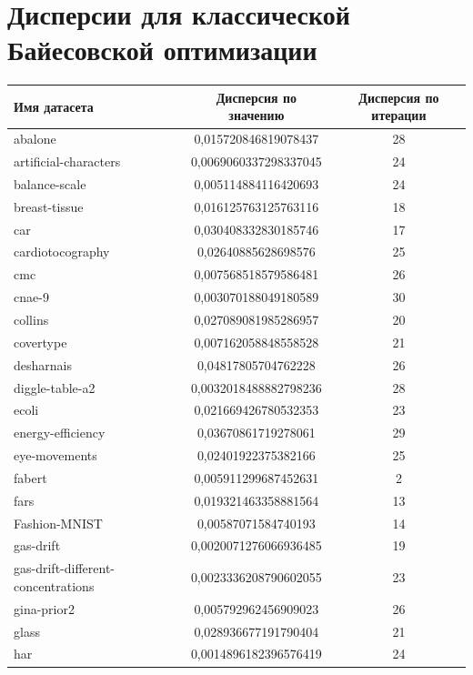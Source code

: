 \documentclass[times,specification,annotation]{itmo-student-thesis}
\begin{document}
\chapter{Дисперсии для классической Байесовской оптимизации}\label{app:сbo-disp}
\begin{center} 
	\begin{longtable}{ |m{5cm}|c|c| } 
		\hline
		\textbf{Имя датасета} & \textbf{Дисперсия по значению} & \textbf{Дисперсия по итерации} \\
		\hline\hline
		abalone & 0,015720846819078437 & 28 \\
		\hline
		artificial-characters & 0,0069060337298337045 & 24 \\
		\hline
		balance-scale & 0,005114884116420693 & 24 \\
		\hline
		breast-tissue & 0,016125763125763116 & 18 \\
		\hline
		car & 0,030408332830185746 & 17 \\
		\hline
		cardiotocography & 0,02640885628698576 & 25 \\
		\hline
		cmc & 0,007568518579586481 & 26 \\
		\hline
		cnae-9 & 0,003070188049180589 & 30 \\
		\hline
		collins & 0,027089081985286957 & 20 \\
		\hline
		covertype & 0,007162058848558528 & 21 \\
		\hline
		desharnais & 0,04817805704762228 & 26 \\
		\hline
		diggle-table-a2 & 0,0032018488882798236 & 28 \\
		\hline
		ecoli & 0,021669426780532353 & 23 \\
		\hline
		energy-efficiency & 0,03670861719278061 & 29 \\
		\hline
		eye-movements & 0,02401922375382166 & 25 \\
		\hline
		fabert & 0,005911299687452631 & 2 \\
		\hline
		fars & 0,019321463358881564 & 13 \\
		\hline
		Fashion-MNIST & 0,00587071584740193 & 14 \\
		\hline
		gas-drift & 0,0020071276066936485 & 19 \\
		\hline
		gas-drift-different-concentrations & 0,0023336208790602055 & 23 \\
		\hline
		gina-prior2 & 0,005792962456909023 & 26 \\
		\hline
		glass & 0,028936677191790404 & 21 \\
		\hline
		har & 0,0014896182396576419 & 24 \\

\end{longtable}
\end{center}
\end{document}
